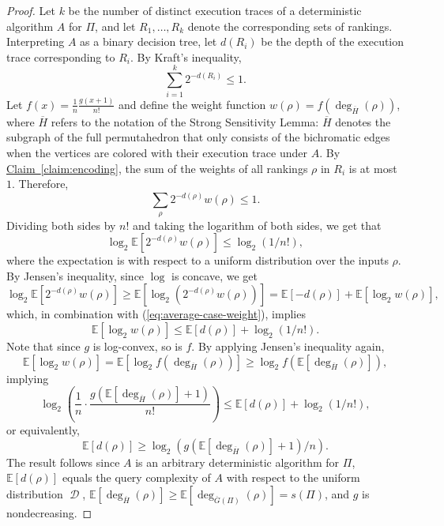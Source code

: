 \documentclass[11pt]{article}
\numberwithin{equation}{section}
\theoremstyle{definition}
\theoremstyle{plain}
\newcommand{\expref}[2]{\hyperref[#2]{#1~\ref{#2}}}
\newcommand{\depth}{d}
\newcommand{\Expect}{\mathbb{E}}
\newcommand{\ranking}{\rho}
\DeclareMathOperator{\dist}{\mathcal{D}}
\begin{document}
\begin{proof}
	Let $k$ be the number of distinct execution traces of a deterministic algorithm $A$ for $\Pi$, and let $R_1,\dots,R_k$ denote the corresponding sets of rankings. Interpreting $A$ as a binary decision tree, let $\depth(R_i)$ be the depth of the execution trace corresponding to $R_i$. By Kraft's inequality,
	\[\sum_{i=1}^{k}2^{-\depth(R_i)}\le 1. \]
	Let $f(x)=\frac{1}{n}\frac{g(x+1)}{n!}$ and define the weight function $w(\ranking)=f(\deg_{\overline{H}}(\ranking))$, where $\overline{H}$ refers to the notation of the Strong Sensitivity Lemma: $\overline{H}$ denotes the subgraph of the full permutahedron that only consists of the bichromatic edges when the vertices are colored with their execution trace under $A$. By \expref{Claim}{claim:encoding}, the sum of the weights of all  rankings $\ranking$ in $R_i$ is at most $1$. Therefore,
	\[\sum_{\ranking} 2^{-\depth(\ranking)} w(\ranking) \le 1. \]
	Dividing both sides by $n!$ and taking the logarithm of both sides, we get that
	\begin{equation}
		\label{eq:average-case-weight}
		\log_2 \Expect\left[2^{-\depth(\ranking)}w(\ranking)\right] \le \log_2(1/n!),
	\end{equation}
	where the expectation is with respect to a uniform distribution over the inputs $\ranking$.
	By Jensen's inequality, since $\log$ is concave, we get 
	\[\log_2 \Expect\left[2^{-\depth(\ranking)}w(\ranking)\right] \ge \Expect\left[\log_2 \left(2^{-\depth(\ranking)}w(\ranking) \right)\right]= \Expect[-\depth(\ranking)]+\Expect[\log_2 w(\ranking)], \]
	which, in combination with (\ref{eq:average-case-weight}), implies
	\[\Expect[\log_2 w(\ranking)] \le \Expect[\depth(\ranking)]+\log_2(1/n!). \]
	Note that since $g$ is log-convex, so is $f$. By applying Jensen's inequality again,  
	\[\Expect[\log_2 w(\ranking)]=\Expect[\log_2 f(\deg_{\overline{H}}(\ranking))]\ge \log_2 f(\Expect[\deg_{\overline{H}}(\ranking)]),\]
	implying 
	\[ \log_2\left(\frac{1}{n}\cdot \frac{g(\Expect[\deg_{\overline{H}}(\ranking)]+1)}{n!}\right) \le \Expect[\depth(\ranking)]+\log_2(1/n!), \]
	or equivalently,
	\[ \Expect[\depth(\ranking)] \ge \log_2(g(\Expect[\deg_{\overline{H}}(\ranking)]+1)/n). \]
	The result follows since $A$ is an arbitrary deterministic algorithm for $\Pi$, $\Expect[\depth(\ranking)]$ equals the query complexity of $A$ with respect to the uniform distribution $\dist$, $\Expect[\deg_{\overline{H}}(\ranking)] \ge \Expect[\deg_{\overline{G}(\Pi)}(\ranking)] = s(\Pi)$, and $g$ is nondecreasing. 
\end{proof}
\end{document}
